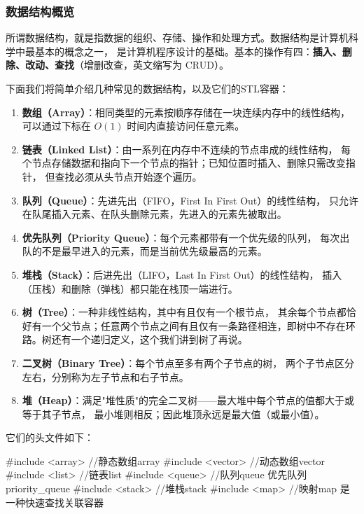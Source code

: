\subsubsection{数据结构概览}

所谓数据结构，就是指数据的组织、存储、操作和处理方式。数据结构是计算机科学中最基本的概念之一，
是计算机程序设计的基础。基本的操作有四：\textbf{插入、删除、改动、查找}（增删改查，英文缩写为 CRUD）。

下面我们将简单介绍几种常见的数据结构，以及它们的STL容器：

\begin{enumerate}
    \item \textbf{数组（Array）}：相同类型的元素按顺序存储在一块连续内存中的线性结构，
    可以通过下标在 $O(1)$ 时间内直接访问任意元素。
    \item \textbf{链表（Linked List）}：由一系列在内存中不连续的节点串成的线性结构，
    每个节点存储数据和指向下一个节点的指针；已知位置时插入、删除只需改变指针，
    但查找必须从头节点开始逐个遍历。
    \item \textbf{队列（Queue）}：先进先出（FIFO，First In First Out）的线性结构，
    只允许在队尾插入元素、在队头删除元素，先进入的元素先被取出。
    \item \textbf{优先队列（Priority Queue）}：每个元素都带有一个优先级的队列，
    每次出队的不是最早进入的元素，而是当前优先级最高的元素。
    \item \textbf{堆栈（Stack）}：后进先出（LIFO，Last In First Out）的线性结构，
    插入（压栈）和删除（弹栈）都只能在栈顶一端进行。
    \item \textbf{树（Tree）}：一种非线性结构，其中有且仅有一个根节点，
    其余每个节点都恰好有一个父节点；任意两个节点之间有且仅有一条路径相连，即树中不存在环路。树还有一个递归定义，这个我们讲到树了再说。
    \item \textbf{二叉树（Binary Tree）}：每个节点至多有两个子节点的树，
    两个子节点区分左右，分别称为左子节点和右子节点。
    \item \textbf{堆（Heap）}：满足"堆性质"的完全二叉树——最大堆中每个节点的值都大于或等于其子节点，
    最小堆则相反；因此堆顶永远是最大值（或最小值）。
\end{enumerate}

它们的头文件如下：

\begin{tcode}
#include <array>    //静态数组array
#include <vector>   //动态数组vector
#include <list>     //链表list
#include <queue>    //队列queue 优先队列priority_queue
#include <stack>    //堆栈stack
#include <map>      //映射map 是一种快速查找关联容器
\end{tcode}

